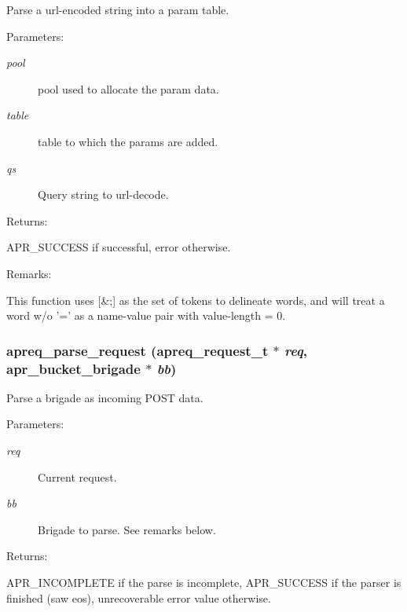 Parse a url-encoded string into a param table. \begin{Desc}
\item[Parameters: ]\par
\begin{description}
\item[{\em 
pool}]pool used to allocate the param data. \item[{\em 
table}]table to which the params are added. \item[{\em 
qs}]Query string to url-decode. \end{description}
\end{Desc}
\begin{Desc}
\item[Returns: ]\par
APR\_\-SUCCESS if successful, error otherwise. \end{Desc}
\begin{Desc}
\item[Remarks: ]\par
This function uses [\&;] as the set of tokens to delineate words, and will treat a word w/o '=' as a name-value pair with value-length = 0. \end{Desc}
\subsubsection{ apreq\_\-parse\_\-request ({\bf apreq\_\-request\_\-t} $\ast$ {\em req}, {\bf apr\_\-bucket\_\-brigade} $\ast$ {\em bb})}\label{group__params_a13}


Parse a brigade as incoming POST data. \begin{Desc}
\item[Parameters: ]\par
\begin{description}
\item[{\em 
req}]Current request. \item[{\em 
bb}]Brigade to parse. See remarks below. \end{description}
\end{Desc}
\begin{Desc}
\item[Returns: ]\par
APR\_\-INCOMPLETE if the parse is incomplete, APR\_\-SUCCESS if the parser is finished (saw eos), unrecoverable error value otherwise. \end{Desc}
